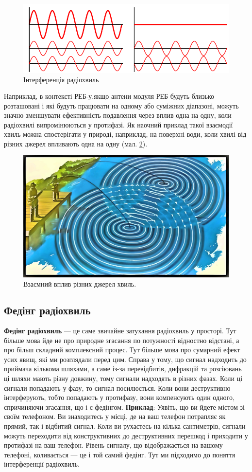 \documentclass{article}
\begin{document}
\begin{figure}[h!]
\centering
\includegraphics[width=0.7\linewidth]{images/interferense.png}
\caption{\label{fig:interferense}Інтерференція радіохвиль}
\end{figure}

Наприклад, в контексті РЕБ-у,якщо антени модуля РЕБ будуть близько розташовані і які будуть працювати на одному або суміжних діапазоні, можуть значно зменшувати ефективність подавлення через вплив одна на одну, коли радіохвилі випромінюються у протифазі. Як наочний приклад такої взаємодії хвиль можна спостерігати у природі, наприклад, на поверхні води, коли хвилі від різних джерел впливають одна на одну (мал. \ref{fig:two-emmitions}).

\begin{figure}[h!]
\centering
\includegraphics[width=0.6\linewidth]{images/two-emmitions.png}
\caption{\label{fig:two-emmitions}Взаємний вплив різних джерел хвиль.}
\end{figure}

\subsection{Федінг радіохвиль}

\textbf{Федінг радіохвиль} --- це саме звичайне затухання радіохвиль у просторі. Тут більше мова йде не про природне згасання по потужності відностно відстані, а про більш складний комплексний процес. Тут більше мова про сумарний ефект усих явищ, які ми розглядали перед цим. Справа у тому, що сигнал надходить до приймача кількома шляхами, а саме із-за перевідбитів, дифракцій та розсіювань ці шляхи мають різну довжину, тому сигнали надходять в різних фазах. Коли ці сигнали попадають у фазу, то сигнал посилюється. Коли вони деструктивно інтерферують, тобто попадають у протифазу, вони компенсують один одного, спричиняючи згасання, що і є федінгом. \textbf{Приклад}: Уявіть, що ви йдете містом зі своїм телефоном. Ви знаходитесь у місці, де на ваш телефон потрапляє як прямий, так і відбитий сигнал. Коли ви рухаєтесь на кілька сантиметрів, сигнали можуть переходити від конструктивних до деструктивних перешкод і приходити у протифазі на ваш телефон. Рівень сигналу, що відображається на вашому телефоні, коливається — це і той самий федінг. Тут ми підходимо до поняття інтерференції радіохвиль.
\end{document}
